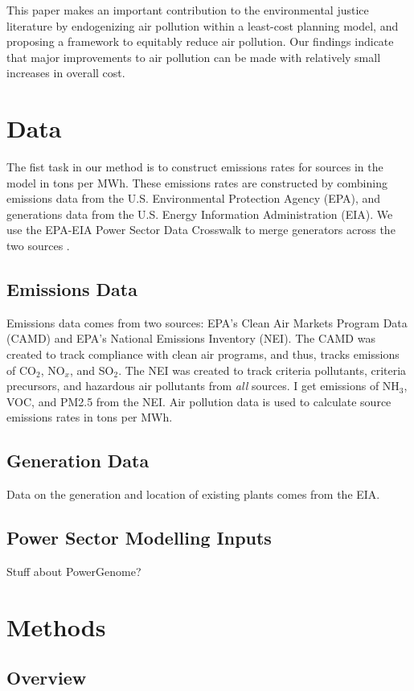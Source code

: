 \documentclass[a4paper]{article}
\theoremstyle{definition}
\theoremstyle{plain}
\begin{document}
This paper makes an important contribution to the environmental justice literature by endogenizing air pollution within a least-cost planning model, and proposing a framework to equitably reduce air pollution. Our findings indicate that major improvements to air pollution can be made with relatively small increases in overall cost.


\section{Data}
The fist task in our method is to construct emissions rates for sources in the model in tons per MWh. These emissions rates are constructed by combining emissions data from the U.S. Environmental Protection Agency (EPA), and generations data from the U.S. Energy Information Administration (EIA). We use the EPA-EIA Power Sector Data Crosswalk to merge generators across the two sources \citep{HuettemanEPA-EIACrosswalk}.

\subsection{Emissions Data}
Emissions data comes from two sources: EPA's Clean Air Markets Program Data (CAMD) and EPA's National Emissions Inventory (NEI).  The CAMD was created to track compliance with clean air programs, and thus, tracks emissions of CO$_2$, NO$_x$, and SO$_2$.  The NEI was created to track criteria pollutants, criteria precursors, and hazardous air pollutants from \textit{all} sources.  I get emissions of NH$_3$, VOC, and PM2.5 from the NEI.  Air pollution data is used to calculate source emissions rates in tons per MWh.

\subsection{Generation Data}
Data on the generation and location of existing plants comes from the EIA.


\subsection{Power Sector Modelling Inputs}
Stuff about PowerGenome?

\section{Methods}
\subsection{Overview}
\end{document}
